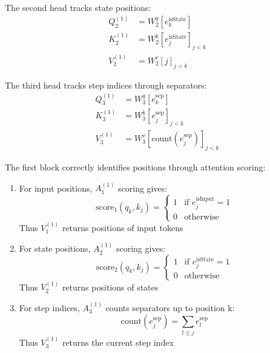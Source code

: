 The second head tracks state positions:
\begin{align*}
    Q^{(1)}_2 &= W^q_2[e^{\text{isState}}_k] \\
    K^{(1)}_2 &= W^k_2[e^{\text{isState}}_j]_{j<k} \\
    V^{(1)}_2 &= W^v_2[j]_{j<k}
\end{align*}

The third head tracks step indices through separators:
\begin{align*}
    Q^{(1)}_3 &= W^q_3[e^{\text{sep}}_k] \\
    K^{(1)}_3 &= W^k_3[e^{\text{sep}}_j]_{j<k} \\
    V^{(1)}_3 &= W^v_3[\text{count}(e^{\text{sep}}_j)]_{j<k}
\end{align*}

\begin{lemma}
The first block correctly identifies positions through attention scoring:
\begin{enumerate}
    \item For input positions, $A^{(1)}_1$ scoring gives:
    \begin{equation*}
        \text{score}_1(q_k, k_j) = \begin{cases}
        1 & \text{if } e^{\text{isInput}}_j = 1 \\
        0 & \text{otherwise}
        \end{cases}
    \end{equation*}
    Thus $V^{(1)}_1$ returns positions of input tokens

    \item For state positions, $A^{(1)}_2$ scoring gives:
    \begin{equation*}
        \text{score}_2(q_k, k_j) = \begin{cases}
        1 & \text{if } e^{\text{isState}}_j = 1 \\
        0 & \text{otherwise}
        \end{cases}
    \end{equation*} 
    Thus $V^{(1)}_2$ returns positions of states

    \item For step indices, $A^{(1)}_3$ counts separators up to position k:
    \begin{equation*}
        \text{count}(e^{\text{sep}}_j) = \sum_{l \leq j} e^{\text{sep}}_l
    \end{equation*}
    Thus $V^{(1)}_3$ returns the current step index
\end{enumerate}
\end{lemma}

